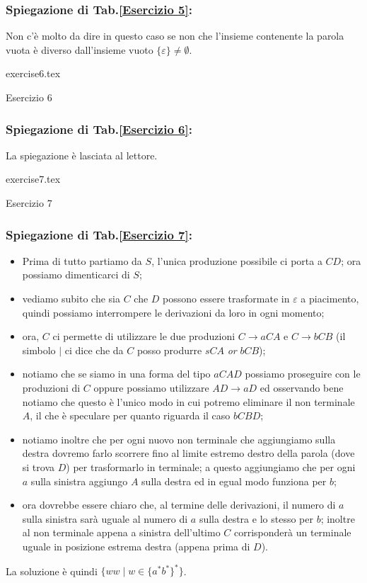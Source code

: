 \documentclass[class=book, crop=false, oneside, 12pt]{standalone}
\begin{document}
\subsubsection*{Spiegazione di Tab.\ref{Esercizio 5}:}
Non c'è molto da dire in questo caso se non che l’insieme contenente la parola vuota è diverso dall’insieme vuoto \(\{\varepsilon\} \neq \emptyset\).
\begin{table}[H]
	\centering
	{exercise6.tex}
    \caption{Esercizio 6}
    \label{Esercizio 6}
\end{table}
\subsubsection*{Spiegazione di Tab.\ref{Esercizio 6}:}
La spiegazione è lasciata al lettore.
\begin{table}[H]
	\centering
	{exercise7.tex}
    \caption{Esercizio 7}
    \label{Esercizio 7}
\end{table}
\subsubsection*{Spiegazione di Tab.\ref{Esercizio 7}:}
\begin{itemize}
    \item Prima di tutto partiamo da \(S\), l'unica produzione possibile ci porta a \(CD\); ora possiamo dimenticarci di \(S\);
    \item vediamo subito che sia \(C\) che \(D\) possono essere trasformate in \(\varepsilon\) a piacimento, quindi possiamo interrompere le derivazioni da loro in ogni momento;
    \item ora, \(C\) ci permette di utilizzare le due produzioni \(C \to aCA\) e \(C \to bCB\) (il simbolo \(\mid\) ci dice che da \(C\) posso produrre \(sCA\) \emph{or} \(bCB\));
    \item notiamo che se siamo in una forma del tipo \(aCAD\) possiamo proseguire con le produzioni di \(C\) oppure possiamo utilizzare \(AD \to aD\) ed osservando bene notiamo che questo è l'unico modo in cui potremo eliminare il non terminale \(A\), il che è speculare per quanto riguarda il caso \(bCBD\);
    \item notiamo inoltre che per ogni nuovo non terminale che aggiungiamo sulla destra dovremo farlo scorrere fino al limite estremo destro della parola (dove si trova \(D\)) per trasformarlo in terminale; a questo aggiungiamo che per ogni \(a\) sulla sinistra aggiungo \(A\) sulla destra ed in egual modo funziona per \(b\);
    \item ora dovrebbe essere chiaro che, al termine delle derivazioni, il numero di \(a\) sulla sinistra  sarà uguale al numero di \(a\) sulla destra e lo stesso per \(b\); inoltre al non terminale appena a sinistra dell'ultimo \(C\) corrisponderà un terminale uguale in posizione estrema destra (appena prima di \(D\)).
\end{itemize}
La soluzione è quindi \(\{ ww \mid w \in \{a^* b^*\}^*\}\).
\end{document}
